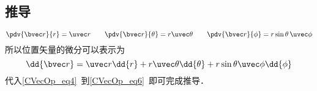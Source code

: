 \subsection{推导}
\begin{equation}\label{SphNab_eq11}
\pdv{\bvec r}{r} = \uvec r \qquad
\pdv{\bvec r}{\theta} = r\uvec \theta \qquad
\pdv{\bvec r}{\phi} = r\sin\theta\,\uvec\phi
\end{equation}
所以位置矢量的微分可以表示为
\begin{equation}\label{SphNab_eq12}
\dd{\bvec r} = \uvec r \dd{r} + r\uvec \theta\dd{\theta} + r\sin\theta\uvec \phi\dd{\phi}
\end{equation}
代入\autoref{CVecOp_eq4}~到\autoref{CVecOp_eq6}~即可完成推导．
